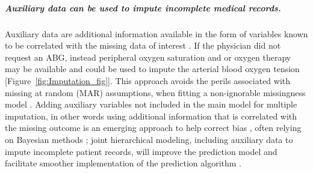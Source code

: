 \documentclass[11pt,notitlepage]{article}
\begin{document}
\subparagraph*{Auxiliary data can be used to impute incomplete medical records.} Auxiliary data are additional information available in the form of variables known to be correlated with the missing data of interest \cite{Daniels24571539}. If the physician did not request an ABG, instead peripheral oxygen saturation and or oxygen therapy may be available and could be used to impute the arterial blood oxygen tension [Figure~\ref{fig:Imputation_fig}]. This approach avoids the perils associated with missing at random (MAR) assumptions, when fitting a non-ignorable missingness model \cite{Wang_20029935}. Adding auxiliary variables not included in the main model for multiple imputation, in other words using additional information that is correlated with the missing outcome is an emerging approach to help correct bias \cite{Meng_1994, Collins_11778676, Rubin_1996}, often relying on Bayesian methods \cite{Daniels_2008, Schafer_1997}; joint hierarchical modeling, including auxiliary data to impute incomplete patient records, will improve the prediction model and facilitate smoother implementation of the prediction algorithm \cite{Hall_25389642}.
\end{document}
